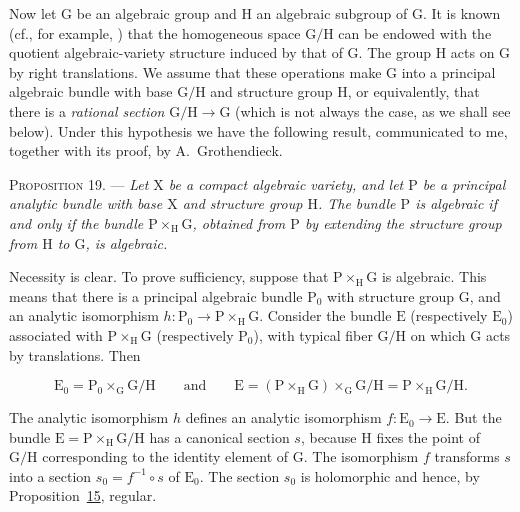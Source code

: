 Now let $\mathrm{G}$ be an algebraic group and $\mathrm{H}$ an algebraic subgroup of $\mathrm{G}$. It is
known (cf., for example, ) that the homogeneous space $\mathrm{G}/\mathrm{H}$ can be endowed
with the quotient algebraic-variety structure induced by that of $\mathrm{G}$. The group $\mathrm{H}$
acts on $\mathrm{G}$ by right translations. We assume that these operations make $\mathrm{G}$
into a principal algebraic bundle with base $\mathrm{G}/\mathrm{H}$ and structure group
$\mathrm{H}$, or equivalently, that there is a \emph{rational section} $\mathrm{G}/\mathrm{H}\to \mathrm{G}$
(which is not always the case, as we shall see below). Under this hypothesis
we have the following result, communicated to me, together with its proof, by
A.~Grothendieck.

\textsc{Proposition 19}. --- \emph{Let $\mathrm{X}$ be a
compact algebraic variety, and let $\mathrm{P}$ be a principal analytic bundle
with base $\mathrm{X}$ and structure group $\mathrm{H}$. The bundle $\mathrm{P}$ is algebraic if and
only if the bundle $\mathrm{P}\times_\mathrm{H}\mathrm{G}$, obtained from $\mathrm{P}$ by extending the
structure group from $\mathrm{H}$ to $\mathrm{G}$, is algebraic.}

Necessity is clear. To prove sufficiency, suppose that $\mathrm{P}\times_\mathrm{H}\mathrm{G}$ is
algebraic. This means that there is a principal algebraic bundle $\mathrm{P}_0$
with structure group $\mathrm{G}$, and an analytic isomorphism
$h:\mathrm{P}_0\to \mathrm{P}\times_\mathrm{H}\mathrm{G}$. Consider the bundle $\mathrm{E}$ (respectively $\mathrm{E}_0$)
associated with $\mathrm{P}\times_\mathrm{H}\mathrm{G}$ (respectively $\mathrm{P}_0$), with typical fiber $\mathrm{G}/\mathrm{H}$
on which $\mathrm{G}$ acts by translations. Then

\begin{equation*}
\mathrm{E}_0=\mathrm{P}_0\times_\mathrm{G}\mathrm{G}/\mathrm{H}
\qquad\text{and}\qquad
\mathrm{E}=(\mathrm{P}\times_\mathrm{H}\mathrm{G})\times_\mathrm{G}\mathrm{G}/\mathrm{H}=\mathrm{P}\times_\mathrm{H}\mathrm{G}/\mathrm{H}.
\end{equation*}

The analytic isomorphism $h$ defines an analytic isomorphism $f:\mathrm{E}_0\to \mathrm{E}$.
But the bundle $\mathrm{E}=\mathrm{P}\times_\mathrm{H}\mathrm{G}/\mathrm{H}$ has a canonical section $s$, because
$\mathrm{H}$ fixes the point of $\mathrm{G}/\mathrm{H}$ corresponding to the identity element of $\mathrm{G}$.
The isomorphism $f$ transforms $s$ into a section
$s_0=f^{-1}\circ s$ of $\mathrm{E}_0$. The section $s_0$ is holomorphic and hence,
by Proposition~\hyperref[gaga:prop:15]{15}, regular.

